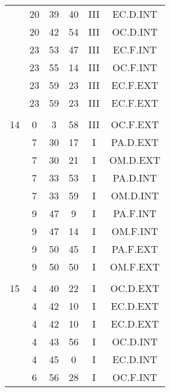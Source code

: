 \documentclass[12pt, a4paper]{article}
\begin{document}
\begin{multicols}{3}
{\begin{tabular}{c c c c c c}
	 	 	 	 & 20 & 39 & 40 & III & EC.D.INT\\%
	 	 	 	 & 20 & 42 & 54 & III & OC.D.INT\\%
	 	 	 	 & 23 & 53 & 47 & III & EC.F.INT\\%
	 	 	 	 & 23 & 55 & 14 & III & OC.F.INT\\%
	 	 	 	 & 23 & 59 & 23 & III & EC.F.EXT\\%
	 	 	 	 & 23 & 59 & 23 & III & EC.F.EXT\\%
	 	 	 	 & & & & & \\%
	 	 	 	14 & 0 & 3 & 58 & III & OC.F.EXT\\%
	 	 	 	 & 7 & 30 & 17 & I & PA.D.EXT\\%
	 	 	 	 & 7 & 30 & 21 & I & OM.D.EXT\\%
	 	 	 	 & 7 & 33 & 53 & I & PA.D.INT\\%
	 	 	 	 & 7 & 33 & 59 & I & OM.D.INT\\%
	 	 	 	 & 9 & 47 & 9 & I & PA.F.INT\\%
	 	 	 	 & 9 & 47 & 14 & I & OM.F.INT\\%
	 	 	 	 & 9 & 50 & 45 & I & PA.F.EXT\\%
	 	 	 	 & 9 & 50 & 50 & I & OM.F.EXT\\%
	 	 	 	 & & & & & \\%
	 	 	 	15 & 4 & 40 & 22 & I & OC.D.EXT\\%
	 	 	 	 & 4 & 42 & 10 & I & EC.D.EXT\\%
	 	 	 	 & 4 & 42 & 10 & I & EC.D.EXT\\%
	 	 	 	 & 4 & 43 & 56 & I & OC.D.INT\\%
	 	 	 	 & 4 & 45 & 0 & I & EC.D.INT\\%
	 	 	 	 & 6 & 56 & 28 & I & OC.F.INT\\%

\end{tabular}}
\end{multicols}
\end{document}
